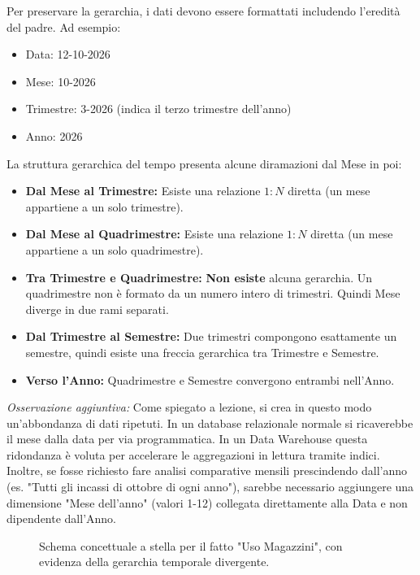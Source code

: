 Per preservare la gerarchia, i dati devono essere formattati includendo l'eredità del padre. Ad esempio:
\begin{itemize}
    \item Data: 12-10-2026
    \item Mese: 10-2026
    \item Trimestre: 3-2026 (indica il terzo trimestre dell'anno)
    \item Anno: 2026
\end{itemize}

La struttura gerarchica del tempo presenta alcune diramazioni dal Mese in poi:
\begin{itemize}
    \item \textbf{Dal Mese al Trimestre:} Esiste una relazione $1:N$ diretta (un mese appartiene a un solo trimestre).
    \item \textbf{Dal Mese al Quadrimestre:} Esiste una relazione $1:N$ diretta (un mese appartiene a un solo quadrimestre).
    \item \textbf{Tra Trimestre e Quadrimestre:} \textbf{Non esiste} alcuna gerarchia. Un quadrimestre non è formato da un numero intero di trimestri. Quindi Mese diverge in due rami separati.
    \item \textbf{Dal Trimestre al Semestre:} Due trimestri compongono esattamente un semestre, quindi esiste una freccia gerarchica tra Trimestre e Semestre.
    \item \textbf{Verso l'Anno:} Quadrimestre e Semestre convergono entrambi nell'Anno.
\end{itemize}

\textit{Osservazione aggiuntiva:} Come spiegato a lezione, si crea in questo modo un'abbondanza di dati ripetuti. In un database relazionale normale si ricaverebbe il mese dalla data per via programmatica. In un Data Warehouse questa ridondanza è voluta per accelerare le aggregazioni in lettura tramite indici. Inoltre, se fosse richiesto fare analisi comparative mensili prescindendo dall'anno (es. "Tutti gli incassi di ottobre di ogni anno"), sarebbe necessario aggiungere una dimensione "Mese dell'anno" (valori 1-12) collegata direttamente alla Data e non dipendente dall'Anno.

\begin{figure}[H]
    \centering
    \caption{Schema concettuale a stella per il fatto "Uso Magazzini", con evidenza della gerarchia temporale divergente.}
    \label{fig:star_schema_1}
\end{figure}


